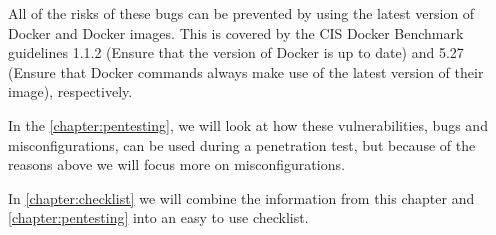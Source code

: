All of the risks of these bugs can be prevented by using the latest version of Docker and Docker images. This is covered by the CIS Docker Benchmark guidelines 1.1.2 (Ensure that the version of Docker is up to date) and 5.27 (Ensure that Docker commands always make use of the latest version of their image), respectively.

In the \autoref{chapter:pentesting}, we will look at how these vulnerabilities, bugs and misconfigurations, can be used during a penetration test, but because of the reasons above we will focus more on misconfigurations.

\medskip

In \autoref{chapter:checklist} we will combine the information from this chapter and \autoref{chapter:pentesting} into an easy to use checklist.



